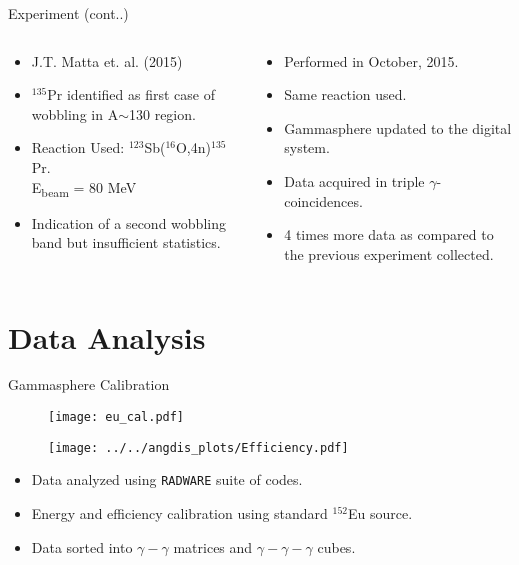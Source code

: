 \documentclass [11pt]{beamer}
\begin{document}
\begin{frame}{Experiment (cont..)}
\begin{columns}[c]
\begin{column}{0.5\textwidth}
\textbf{}
\begin{itemize}
\item{J.T. Matta et. al. (2015)}
\item{$^{135}$Pr identified as first case of wobbling in A$\sim$130 region.}
\item{Reaction Used: $^{123}$Sb($^{16}$O,4n)$^{135}$Pr. \\ E\textsubscript{beam} = 80 MeV}
\item{Indication of a second wobbling band but insufficient statistics.}
\end{itemize}
\end{column}
\hspace{-30pt}
\vrule{}
\begin{column}{0.5\textwidth}
\textbf{}
\begin{itemize}
\item{Performed in October, 2015.}
\item{Same reaction used.}
\item{Gammasphere updated to the digital system.}
\item{Data acquired in triple $\gamma$-coincidences.}
\item{4 times more data as compared to the previous experiment collected.}
\end{itemize}
\end{column}
\end{columns}
\end{frame}

\section{Data Analysis}

\begin{frame}{Gammasphere Calibration}
\begin{figure}
\texttt{[image: eu\_cal.pdf]}
\end{figure}
\begin{multicols}{2}
\begin{figure}
\texttt{[image: ../../angdis\_plots/Efficiency.pdf]}
\end{figure}
\begin{small}
\begin{itemize}
\item{Data analyzed using \texttt{RADWARE} suite of codes.}
\item{Energy and efficiency calibration using standard $^{152}$Eu source.}
\item{Data sorted into $\gamma-\gamma$ matrices and $\gamma-\gamma-\gamma$ cubes.}
\end{itemize}
\end{small}
\end{multicols}
\end{frame}
\end{document}
